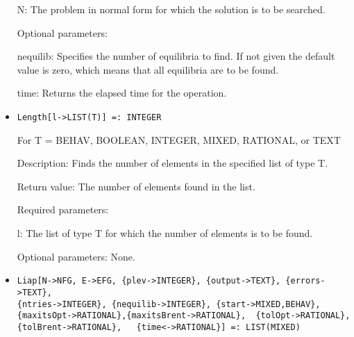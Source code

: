\begin{itemize}
\bd
\item
[N:] The problem in normal form for which the solution is to be
searched.
\ed

\item
[Optional parameters:]\hfil\null

\bd
\item
[nequilib:] Specifies the number of equilibria to find.  If not given
the default value is zero, which means that all equilibria are to be
found.
\item
[time:] Returns the elapsed time for the operation.
\ed
\ed

\item
\protect \large \begin{verbatim}
Length[l->LIST(T)] =: INTEGER
\end{verbatim}\normalsize
	For T = BEHAV, BOOLEAN, INTEGER, MIXED, RATIONAL, or TEXT

\bd
\item
[Description:] Finds the number of elements in the specified list of
type T.
\item
[Return value:] The number of elements found in the list.
\item
[Required parameters:]\hfil\null

\bd
\item
[l:] The list of type T for which the number of elements is to be
found.
\ed

\item
[Optional parameters:] None.
\ed

\item
\protect \large \begin{verbatim}
Liap[N->NFG, E->EFG, {plev->INTEGER}, {output->TEXT}, {errors->TEXT},
{ntries->INTEGER}, {nequilib->INTEGER}, {start->MIXED,BEHAV},
{maxitsOpt->RATIONAL},{maxitsBrent->RATIONAL}, 	{tolOpt->RATIONAL},
{tolBrent->RATIONAL}, 	{time<->RATIONAL}] =: LIST(MIXED)
\end{verbatim}\normalsize


\end{itemize}
